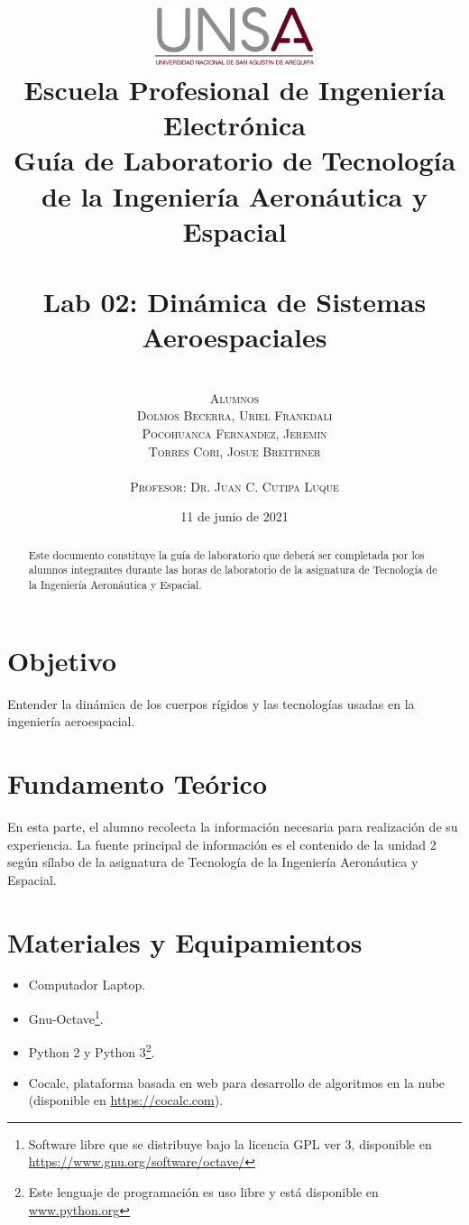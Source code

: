 \documentclass[12pt,oneside,spanish]{article}
\title{ 
	\includegraphics[width=0.35\textwidth]{unsa.eps}\\
	\vspace{0.1cm}
{\large Escuela Profesional de Ingeniería Electrónica \\
\vspace{2cm}
{\small Guía de Laboratorio de Tecnología de la Ingeniería Aeronáutica y Espacial}} \\ 
\vspace{0.1pt} 
\hrulefill \vspace{40pt} \\ 
\textbf{Lab 02: Dinámica de Sistemas Aeroespaciales}\\ 
\vspace{30pt} \hrulefill}
\author{\scshape{\textbf{ }}
\vspace{30pt} \\
	\vspace{0.5cm}
	{\small Alumnos}\\
	{\Large Dolmos Becerra, Uriel Frankdali}\\
	{\Large Pocohuanca Fernandez, Jeremin}\\
	{\Large Torres Cori, Josue Breithner}\\
	\vspace{3cm}\\
{\small Profesor: Dr. Juan C. Cutipa Luque}\\
\vspace{20pt}
}
\date{11 de junio de 2021}
\begin{document}

\maketitle

\newpage

\begin{abstract}
Este documento constituye la guía de laboratorio que deberá ser completada por los alumnos integrantes durante las horas de laboratorio de la asignatura de Tecnología de la Ingeniería Aeronáutica y Espacial.

\end{abstract}


\pagebreak

\tableofcontents

\newpage
{}

%
\section{Objetivo}
Entender la dinámica de los cuerpos rígidos y las tecnologías usadas en la ingeniería aeroespacial.
\section{Fundamento Teórico}
En esta parte, el alumno recolecta la información necesaria para realización de su experiencia. La fuente principal de información es el contenido de la unidad 2 según sílabo de la asignatura de Tecnología de la Ingeniería Aeronáutica y Espacial.

\section{Materiales y Equipamientos}
\begin{itemize}
    \item Computador Laptop.
    \item Gnu-Octave\footnote{Software libre que se distribuye bajo la licencia GPL ver 3, disponible en \url{https://www.gnu.org/software/octave/}}.
    \item Python 2 y Python 3\footnote{Este lenguaje de programación es uso libre y está disponible en \url{www.python.org}}.
    \item Cocalc, plataforma basada en web para desarrollo de algoritmos en la nube (disponible en \url{https://cocalc.com}).
\end{itemize}
\end{document}
